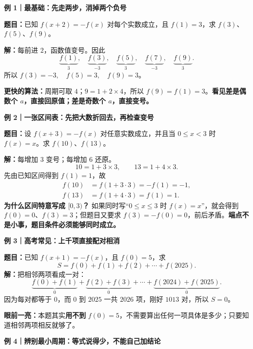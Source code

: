 \clearpage
\begin{examplebox}
\textbf{例 1｜最基础：先走两步，消掉两个负号}



\textbf{题目：}已知 $f(x+2)=-f(x)$ 对每个实数成立，且 $f(1)=3$，求 $f(3)$、$f(5)$、$f(9)$。

\textbf{解：}每前进 $2$，函数值变号。因此
\[
\underbrace{f(1)}_{3},\quad
\underbrace{f(3)}_{-3},\quad
\underbrace{f(5)}_{3},\quad
\underbrace{f(7)}_{-3},\quad
\underbrace{f(9)}_{3}.
\]
所以 $\boxed{f(3)=-3,\quad f(5)=3,\quad f(9)=3}$。

\textbf{更快的算法：}周期可取 $4$；$9=1+2\times4$，所以 $f(9)=f(1)=3$。\textbf{看见差是偶数个 $a$，直接回原值；差是奇数个 $a$，直接变号。}

\medskip
\end{examplebox}\clearpage\begin{examplebox}\textbf{例 2｜一张区间表：先把大数折回去，再检查变号}



\textbf{题目：}设 $f(x+3)=-f(x)$ 对任意实数成立，并且当 $0\le x<3$ 时 $f(x)=x$。求 $f(10)$、$f(13)$。

\textbf{解：}每增加 $3$ 变号；每增加 $6$ 还原。
\[
10=1+3\times3,\qquad 13=1+4\times3.
\]
先由已知区间得到 $f(1)=1$，故
\[
\begin{aligned}
f(10)&=f(1+3\cdot3)=-f(1)=\boxed{-1},\\
f(13)&=f(1+4\cdot3)=f(1)=\boxed{1}.
\end{aligned}
\]
\textbf{为什么区间特意写成 $[0,3)$？} 如果同时写“$0\le x\le3$ 时 $f(x)=x$”，就会得到 $f(0)=0$、$f(3)=3$；但题目又要求 $f(3)=-f(0)=0$，前后矛盾。\textbf{端点不是小事，题目条件必须能够同时成立。}

\medskip
\end{examplebox}\clearpage\begin{examplebox}\textbf{例 3｜高考常见：上千项直接配对相消}



\textbf{题目：}已知 $f(x+1)=-f(x)$，且 $f(0)=5$，求
\[
S=f(0)+f(1)+f(2)+\cdots+f(2025).
\]
\textbf{解：}把相邻两项看成一对：
\[
\underbrace{f(0)+f(1)}_{0}+
\underbrace{f(2)+f(3)}_{0}+\cdots+
\underbrace{f(2024)+f(2025)}_{0}.
\]
因为每对都等于 $0$，而 $0$ 到 $2025$ 一共 $2026$ 项，刚好 $1013$ 对，所以 $\boxed{S=0}$。

\textbf{眼前一亮：}本题其实\textbf{用不到} $f(0)=5$，不需要算出任何一项具体是多少；只要知道相邻两项相反就够了。

\medskip
\end{examplebox}\clearpage\begin{examplebox}\textbf{例 4｜辨别最小周期：等式说得少，不能自己加结论}




\end{examplebox}
